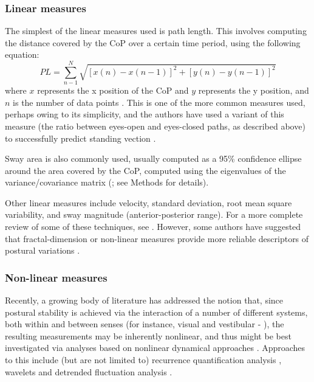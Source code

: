 \documentclass[11pt]{article}
\begin{document}
\begin{linenumbers}
\subsubsection*{Linear measures}  %
The simplest of the linear measures used is path length. This involves computing the distance covered by the CoP over a certain time period, using the following equation: 
\begin{equation}\label{eq:1}
PL = \sum_{n-1}^{N} \sqrt{[x(n) - x(n-1)]^2+[y(n) - y(n-1)]^2}
\end{equation}
where $x$ represents the x position of the CoP and $y$ represents the y position, and $n$ is the number of data points \cite{Kim:2009dz}. This is one of the more common measures used, perhaps owing to its simplicity, and the authors have used a variant of this measure (the ratio between eyes-open and eyes-closed paths, as described above) to successfully predict standing vection \cite{Palmisano:2014ez}. 

Sway area is also commonly used, usually computed as a 95\% confidence ellipse around the area covered by the CoP, computed using the eigenvalues of the variance/covariance matrix (\cite{Oliveira:1996ho,Zbilut:1992cz}; see Methods for details).  %

Other linear measures include velocity, standard deviation, root mean square variability, and sway magnitude (anterior-posterior range).  For a more complete review of some of these techniques, see \cite{Duarte:2010gu}. However, some authors have suggested that fractal-dimension or non-linear measures provide more reliable descriptors of postural variations \cite{Doyle:2005fp}. 

\subsubsection*{Non-linear measures}

Recently, a growing body of literature has addressed the notion that, since postural stability is achieved via the interaction of a number of different systems, both within and between senses (for instance, visual and vestibular - \cite{Kiemel:2002gk, vanderKooij:2011jm}), the resulting measurements may be inherently nonlinear, and thus might be best investigated via analyses based on nonlinear dynamical approaches \cite{Kirchner:2012bd, Duarte:2000vh}. Approaches to this include (but are not limited to) recurrence quantification analysis \cite{Riley:2003vh, Donner:2010je, Ramdani:2013da}, wavelets \cite{Chagdes:2009dl} and detrended fluctuation analysis \cite{Kantelhardt:2001dr,Kantelhardt:2002cc}.


\end{linenumbers}
\end{document}
